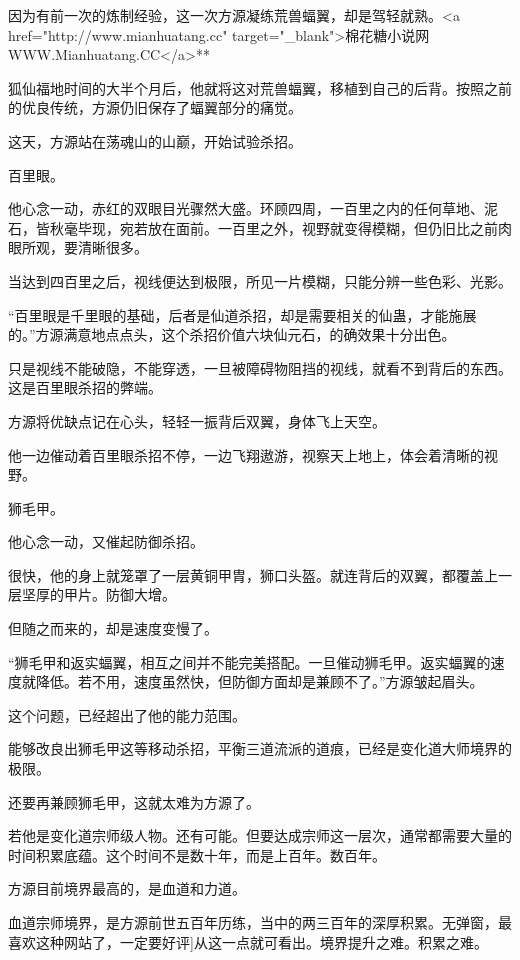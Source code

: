
\begin{this_body}

因为有前一次的炼制经验，这一次方源凝练荒兽蝠翼，却是驾轻就熟。<a href="http://www.mianhuatang.cc" target="\_blank">棉花糖小说网WWW.Mianhuatang.CC</a>**

狐仙福地时间的大半个月后，他就将这对荒兽蝠翼，移植到自己的后背。按照之前的优良传统，方源仍旧保存了蝠翼部分的痛觉。

这天，方源站在荡魂山的山巅，开始试验杀招。

百里眼。

他心念一动，赤红的双眼目光骤然大盛。环顾四周，一百里之内的任何草地、泥石，皆秋毫毕现，宛若放在面前。一百里之外，视野就变得模糊，但仍旧比之前肉眼所观，要清晰很多。

当达到四百里之后，视线便达到极限，所见一片模糊，只能分辨一些色彩、光影。

“百里眼是千里眼的基础，后者是仙道杀招，却是需要相关的仙蛊，才能施展的。”方源满意地点点头，这个杀招价值六块仙元石，的确效果十分出色。

只是视线不能破隐，不能穿透，一旦被障碍物阻挡的视线，就看不到背后的东西。这是百里眼杀招的弊端。

方源将优缺点记在心头，轻轻一振背后双翼，身体飞上天空。

他一边催动着百里眼杀招不停，一边飞翔遨游，视察天上地上，体会着清晰的视野。

狮毛甲。

他心念一动，又催起防御杀招。

很快，他的身上就笼罩了一层黄铜甲胄，狮口头盔。就连背后的双翼，都覆盖上一层坚厚的甲片。防御大增。

但随之而来的，却是速度变慢了。

“狮毛甲和返实蝠翼，相互之间并不能完美搭配。一旦催动狮毛甲。返实蝠翼的速度就降低。若不用，速度虽然快，但防御方面却是兼顾不了。”方源皱起眉头。

这个问题，已经超出了他的能力范围。

能够改良出狮毛甲这等移动杀招，平衡三道流派的道痕，已经是变化道大师境界的极限。

还要再兼顾狮毛甲，这就太难为方源了。

若他是变化道宗师级人物。还有可能。但要达成宗师这一层次，通常都需要大量的时间积累底蕴。这个时间不是数十年，而是上百年。数百年。

方源目前境界最高的，是血道和力道。

血道宗师境界，是方源前世五百年历练，当中的两三百年的深厚积累。无弹窗，最喜欢这种网站了，一定要好评]从这一点就可看出。境界提升之难。积累之难。


\end{this_body}
